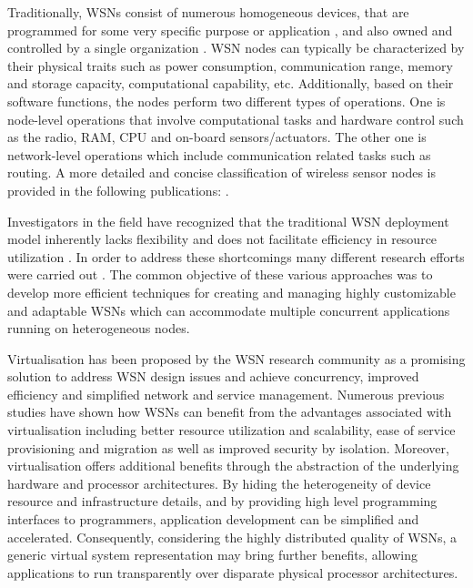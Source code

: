 Traditionally, WSNs consist of numerous homogeneous devices, that are programmed for some very specific purpose or application \cite{ammari2013art,mittal2012contemporary}, and also owned and controlled by a single organization \cite{Yick:2008:WSN:1389582.1389832,obaidat2014principles}. WSN nodes can typically be characterized by their physical traits such as power consumption, communication range, memory and storage capacity, computational capability, etc.
Additionally, based on their software functions, the nodes perform two different types of operations. One is node-level operations that involve computational tasks and hardware control such as the radio, RAM, CPU and on-board sensors/actuators. The other one is network-level operations which include communication related tasks such as routing. A more detailed and concise
classification of wireless sensor nodes is provided in the following publications: \cite{davis2012survey,mottola2011programming,Akyildiz2002393}.  

Investigators in the field have recognized that the traditional WSN deployment model inherently lacks flexibility and does not facilitate efficiency in resource utilization \cite{islam2012virtualization}. In order to address these shortcomings many different research efforts were carried out  \cite{virtual_sensor_networks,Leontiadis:2012:STS:2187181.2187188,Fok:2009:AMA:1552297.1552299}. The common objective of these various approaches was to develop more efficient techniques for creating and managing highly customizable and adaptable WSNs which can accommodate multiple concurrent applications running on heterogeneous nodes.  

Virtualisation has been proposed by the WSN research community as a promising solution to address WSN design issues \cite{islam2012survey} and achieve concurrency, improved efficiency and simplified network and service management.
Numerous previous studies have shown how WSNs can benefit from the advantages associated with virtualisation \cite{6076694} including better resource utilization and scalability, ease of service provisioning and migration as well as improved security by isolation. Moreover, virtualisation offers additional benefits through the abstraction of the underlying hardware and processor architectures. By hiding the heterogeneity of device resource and infrastructure details, and by providing high level programming interfaces to programmers, application development can be simplified and accelerated. Consequently, considering the highly distributed quality of WSNs, a generic virtual system representation may bring further benefits, allowing applications to run transparently over disparate physical processor architectures.  

